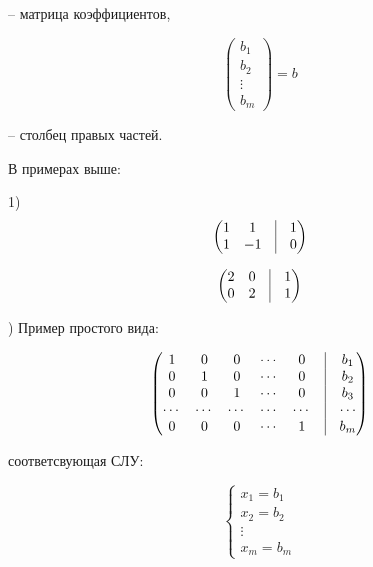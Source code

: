-- матрица коэффициентов,

\begin{equation*}
	\begin{pmatrix}
		b_1 \\
        b_2 \\
        \vdots \\
        b_m
	\end{pmatrix}
    = b
\end{equation*}

-- столбец правых частей.

\bigskip
В примерах выше:

1) 
\begin{equation*}
	\begin{pmatrix}
		1 & 1 & \vrule & 1 \\
        1 & -1 & \vrule & 0 
	\end{pmatrix}
\end{equation*}

\begin{equation*}
	\begin{pmatrix}
		2 & 0 & \vrule & 1 \\
        0 & 2 & \vrule & 1 
	\end{pmatrix}
\end{equation*}

) Пример простого вида:

\begin{equation*}
	\begin{pmatrix}
		1 & 0 & 0 & \cdots & 0 & \vrule & b_1 \\
		0 & 1 & 0 & \cdots & 0 & \vrule & b_2 \\
        0 & 0 & 1 & \cdots & 0 & \vrule & b_3 \\
        \cdots & \cdots & \cdots & \cdots & \cdots & \vrule & \cdots \\
        0 & 0 & 0 & \cdots & 1 & \vrule & b_m 
	\end{pmatrix}
\end{equation*}

соответсвующая СЛУ:

\begin{equation*}
    \left\{
		\begin{aligned}
        x_1 = b_1 \\
        x_2 = b_2 \\
        \vdots \\
        x_m = b_m
		\end{aligned}
	\right.
\end{equation*}

